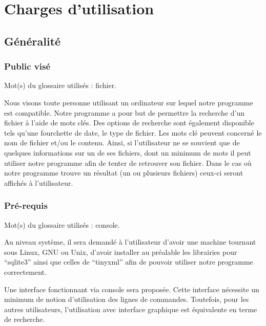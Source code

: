 \chapter{Charges d'utilisation}

\section{Généralité}

\subsection{Public visé}
Mot(s) du glossaire utilisés : \gls{fichier}.

Nous visons toute personne utilisant un ordinateur sur lequel notre programme est compatible. Notre programme a pour but de permettre la recherche d'un fichier à l'aide de mots clés. Des options de recherche sont également disponible tels qu'une fourchette de date, le type de fichier. Les mots clé peuvent concerné le nom de fichier et/ou le contenu. Ainsi, si l'utilisateur ne se souvient que de quelques informations sur un de ses fichiers, dont un minimum de mots il peut utiliser notre programme afin de tenter de retrouver son fichier. Dans le cas où notre programme trouve un résultat (un ou plusieurs fichiers) ceux-ci seront affichés à l'utilisateur.

\subsection{Pré-requis}
Mot(s) du glossaire utilisés : \gls{console}.

Au niveau système, il sera demandé à l'utilisateur d'avoir une machine tournant sous Linux, GNU ou Unix, d'avoir installer au préalable les librairies pour \enquote{sqlite3} ainsi que celles de \enquote{tinyxml} afin de pouvoir utiliser notre programme correctement.

Une interface fonctionnant via console sera proposée. Cette interface nécessite un minimum de notion d'utilisation des lignes de commandes. Toutefois, pour les autres utilisateurs, l'utilisation avec interface graphique est équivalente en terme de recherche.

\newpage

